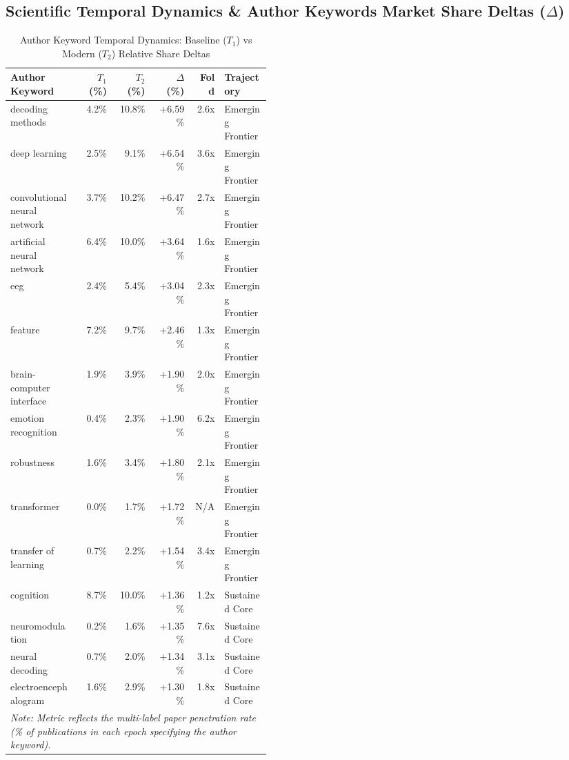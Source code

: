 \subsection{Scientific Temporal Dynamics \& Author Keywords Market Share Deltas (\texorpdfstring{$\Delta$}{Delta})}
\begin{table}[htbp]
\caption{Author Keyword Temporal Dynamics: Baseline ($T_1$) vs Modern ($T_2$) Relative Share Deltas}
\label{tab:temporal_deltas}
\small
\setlength{\tabcolsep}{4pt}
\begin{tabular}{p{0.26\linewidth} r r r r p{0.18\linewidth}}
\toprule
\textbf{Author Keyword} & \textbf{$T_1$ (\%)} & \textbf{$T_2$ (\%)} & \textbf{$\Delta$ (\%)} & \textbf{Fold} & \textbf{Trajectory} \\
\midrule
decoding methods & 4.2\% & 10.8\% & +6.59\% & 2.6x & Emerging Frontier \\
deep learning & 2.5\% & 9.1\% & +6.54\% & 3.6x & Emerging Frontier \\
convolutional neural network & 3.7\% & 10.2\% & +6.47\% & 2.7x & Emerging Frontier \\
artificial neural network & 6.4\% & 10.0\% & +3.64\% & 1.6x & Emerging Frontier \\
eeg & 2.4\% & 5.4\% & +3.04\% & 2.3x & Emerging Frontier \\
feature & 7.2\% & 9.7\% & +2.46\% & 1.3x & Emerging Frontier \\
brain-computer interface & 1.9\% & 3.9\% & +1.90\% & 2.0x & Emerging Frontier \\
emotion recognition & 0.4\% & 2.3\% & +1.90\% & 6.2x & Emerging Frontier \\
robustness & 1.6\% & 3.4\% & +1.80\% & 2.1x & Emerging Frontier \\
transformer & 0.0\% & 1.7\% & +1.72\% & N/A & Emerging Frontier \\
transfer of learning & 0.7\% & 2.2\% & +1.54\% & 3.4x & Emerging Frontier \\
cognition & 8.7\% & 10.0\% & +1.36\% & 1.2x & Sustained Core \\
neuromodulation & 0.2\% & 1.6\% & +1.35\% & 7.6x & Sustained Core \\
neural decoding & 0.7\% & 2.0\% & +1.34\% & 3.1x & Sustained Core \\
electroencephalogram & 1.6\% & 2.9\% & +1.30\% & 1.8x & Sustained Core \\
\bottomrule
\multicolumn{6}{p{0.95\linewidth}}{\scriptsize \textit{Note: Metric reflects the multi-label paper penetration rate (\% of publications in each epoch specifying the author keyword).}} \\
\end{tabular}
\end{table}
